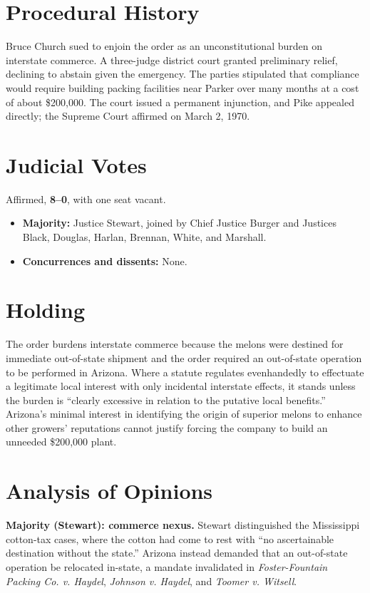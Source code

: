\documentclass[12pt]{article}
\begin{document}
\section{Procedural History}

Bruce Church sued to enjoin the order as an unconstitutional burden on interstate commerce. A three-judge district court granted preliminary relief, declining to abstain given the emergency. The parties stipulated that compliance would require building packing facilities near Parker over many months at a cost of about \$200,000. The court issued a permanent injunction, and Pike appealed directly; the Supreme Court affirmed on March 2, 1970.

\section{Judicial Votes}

Affirmed, \textbf{8--0}, with one seat vacant.
\begin{itemize}
\item \textbf{Majority:} Justice Stewart, joined by Chief Justice Burger and Justices Black, Douglas, Harlan, Brennan, White, and Marshall.
\item \textbf{Concurrences and dissents:} None.
\end{itemize}

\section{Holding}

The order burdens interstate commerce because the melons were destined for immediate out-of-state shipment and the order required an out-of-state operation to be performed in Arizona. Where a statute regulates evenhandedly to effectuate a legitimate local interest with only incidental interstate effects, it stands unless the burden is ``clearly excessive in relation to the putative local benefits.'' Arizona's minimal interest in identifying the origin of superior melons to enhance other growers' reputations cannot justify forcing the company to build an unneeded \$200,000 plant.

\section{Analysis of Opinions}

\textbf{Majority (Stewart): commerce nexus.} Stewart distinguished the Mississippi cotton-tax cases, where the cotton had come to rest with ``no ascertainable destination without the state.'' Arizona instead demanded that an out-of-state operation be relocated in-state, a mandate invalidated in \textit{Foster-Fountain Packing Co. v. Haydel}, \textit{Johnson v. Haydel}, and \textit{Toomer v. Witsell}.
\end{document}
